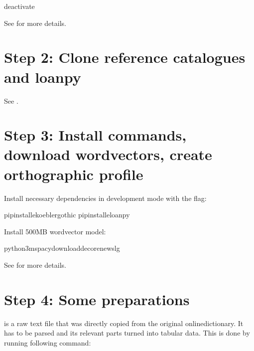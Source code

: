 \documentclass[letterpaper,10pt,english]{sphinxmanual}
\begin{document}
{{{{\begin{sphinxVerbatim}[commandchars=\\\{\}]
deactivate
\end{sphinxVerbatim}

\sphinxAtStartPar
See 
for more details.


\section{Step 2: Clone reference catalogues and loanpy}
\label{\detokenize{mkcldf:step-2-clone-reference-catalogues-and-loanpy}}
\sphinxAtStartPar
See .


\section{Step 3: Install commands, download wordvectors, create orthographic profile}
\label{\detokenize{mkcldf:step-3-install-commands-download-wordvectors-create-orthographic-profile}}
\sphinxAtStartPar
Install necessary dependencies in development mode with the  flag:

\begin{sphinxVerbatim}[commandchars=\\\{\}]
pipinstall\PYGZhy{}ekoeblergothic
pipinstall\PYGZhy{}eloanpy
\end{sphinxVerbatim}

\sphinxAtStartPar
Install 500MB word\sphinxhyphen{}vector model:

\begin{sphinxVerbatim}[commandchars=\\\{\}]
python3\PYGZhy{}mspacydownloadde\PYGZus{}core\PYGZus{}news\PYGZus{}lg
\end{sphinxVerbatim}

\sphinxAtStartPar
See 
for more details.


\section{Step 4: Some preparations}
\label{\detokenize{mkcldf:step-4-some-preparations}}
\sphinxAtStartPar
{} is a raw text file that was directly copied from the
original online\sphinxhyphen{}dictionary. It has to be parsed and its relevant parts turned
into tabular data. This is done by running following command:

}}}}
\end{document}
